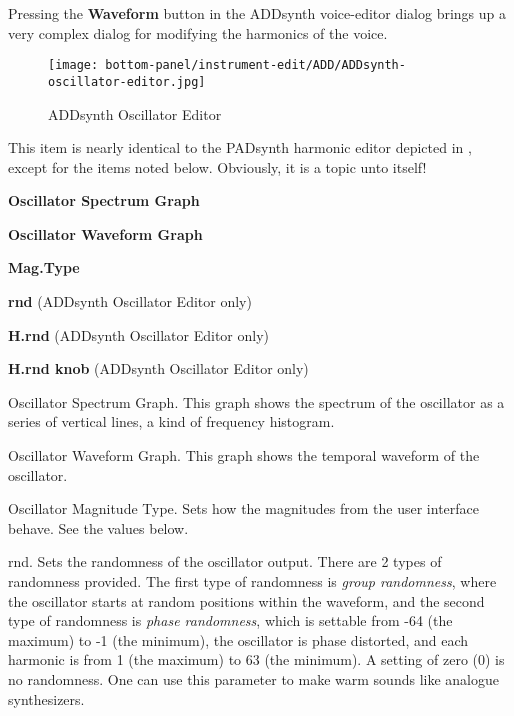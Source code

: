    Pressing the \textbf{Waveform} button in the ADDsynth
   voice-editor dialog brings up a very complex dialog for modifying the
   harmonics of the voice.

\begin{figure}[H]
   \centering 
   \texttt{[image: bottom-panel/instrument-edit/ADD/ADDsynth-oscillator-editor.jpg]}
   \caption{ADDsynth Oscillator Editor}
   \label{fig:addsynth_oscillator_editor}
\end{figure}

   This item is nearly identical to the PADsynth harmonic editor depicted in
   ,
   except for the items noted below.
   Obviously, it is a topic unto itself!

   \begin{enumber}
      \item \textbf{Oscillator Spectrum Graph}
      \item \textbf{Oscillator Waveform Graph}
      \item \textbf{Mag.Type}
      \item \textbf{rnd} (ADDsynth Oscillator Editor only)
      \item \textbf{H.rnd} (ADDsynth Oscillator Editor only)
      \item \textbf{H.rnd knob} (ADDsynth Oscillator Editor only)
   \end{enumber}

   \setcounter{ItemCounter}{0}      %

   Oscillator Spectrum Graph.
   This graph shows the spectrum of the oscillator as a series of vertical
   lines, a kind of frequency histogram.

   Oscillator Waveform Graph.
   This graph shows the temporal waveform  of the oscillator.

   Oscillator Magnitude Type.
   Sets how the magnitudes from the user interface behave.  See the values
   below.

   rnd. Sets the randomness of the oscillator output. There are 2 types of
   randomness provided.  The first type of randomness is
   \textsl{group randomness},
   where the oscillator starts at random positions within the waveform,
   and the second type of randomness is
   \textsl{phase randomness},
   which is settable from -64 (the maximum) to -1 (the minimum),
   the oscillator is phase distorted,
   and each harmonic is from 1 (the maximum) to 63 (the minimum).
   A setting of zero (0) is no randomness.
   One can use this parameter to make warm sounds like
   analogue synthesizers.


